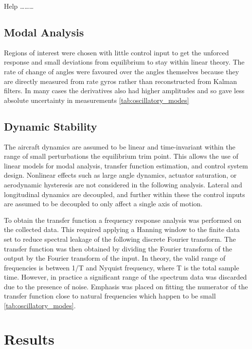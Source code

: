 \documentclass{article}
\begin{document}
Help \dots \dots \dots

\subsection{Modal Analysis}

Regions of interest were chosen with little control input to get the unforced response and small deviations
from equilibrium to stay within linear theory. The rate of change of angles were favoured over the angles
themselves because they are directly measured from rate gyros rather than reconstructed from Kalman
filters. In many cases the derivatives also had higher amplitudes and so gave less absolute uncertainty in
measurements \ref{tab:oscillatory_modes}


\subsection{Dynamic Stability}

The aircraft dynamics are assumed to be linear and time-invariant within the range of small perturbations the equilibrium trim point.
This allows the use of linear models for modal analysis, transfer function estimation, and control system design.
Nonlinear effects such as large angle dynamics, actuator saturation, or aerodynamic hysteresis are not considered in the following analysis.
Lateral and longitudinal dynamics are decoupled, and further within these the control inputs are assumed to be decoupled to only affect a single axis of motion.

To obtain the transfer function a frequency response analysis was performed on the collected data.
This required applying a Hanning window to the finite data set to reduce spectral leakage of the following discrete Fourier transform.
The transfer function was then obtained by dividing the Fourier transform of the output by the Fourier transform of the input.
In theory, the valid range of frequencies is between 1/T and Nyquist frequency, where T is the total sample time.
However, in practice a significant range of the spectrum data was discarded due to the presence of noise.
Emphasis was placed on fitting the numerator of the transfer function close to natural frequencies which happen to be small \ref{tab:oscillatory_modes}.

\section{Results}
\end{document}
